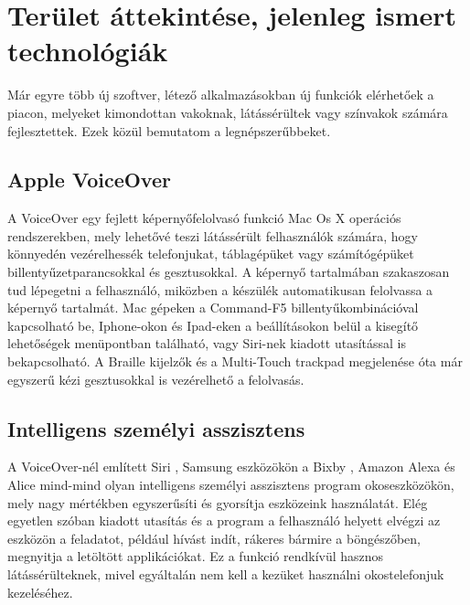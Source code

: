 \documentclass[12pt]{report}
\begin{document}
\chapter{Terület áttekintése, jelenleg ismert technológiák}
Már egyre több új szoftver, létező alkalmazásokban új funkciók elérhetőek a piacon, melyeket kimondottan vakoknak, látássérültek vagy színvakok számára fejlesztettek. Ezek közül bemutatom a legnépszerűbbeket.
\section{Apple VoiceOver}
A VoiceOver \cite{voiceover} egy fejlett képernyőfelolvasó funkció Mac Os X operációs rendszerekben, mely lehetővé teszi látássérült felhasználók számára, hogy könnyedén vezérelhessék telefonjukat, táblagépüket vagy számítógépüket billentyűzetparancsokkal \cite{keysforvoiceover} és gesztusokkal. \cite{usingvoiceover} A képernyő tartalmában szakaszosan tud lépegetni a felhasználó, miközben a készülék automatikusan felolvassa a képernyő tartalmát. Mac gépeken a Command-F5 billentyűkombinációval kapcsolható be, Iphone-okon és Ipad-eken a beállításokon belül a kisegítő lehetőségek menüpontban található, vagy Siri-nek kiadott utasítással is bekapcsolható. A Braille kijelzők \cite{braille} és a Multi-Touch trackpad \cite{multitouch} megjelenése óta már egyszerű kézi gesztusokkal is vezérelhető a felolvasás. \cite{usingvoiceover}

\section{Intelligens személyi asszisztens}
A VoiceOver-nél említett Siri \cite{siri}, Samsung eszközökön a Bixby \cite{bixby}, Amazon Alexa és Alice mind-mind olyan intelligens személyi asszisztens program okoseszközökön, mely nagy mértékben egyszerűsíti és gyorsítja eszközeink használatát. Elég egyetlen szóban kiadott utasítás és a program a felhasználó helyett elvégzi az eszközön a feladatot, például hívást indít, rákeres bármire a böngészőben, megnyitja a letöltött applikációkat. Ez a funkció rendkívül hasznos látássérülteknek, mivel egyáltalán nem kell a kezüket használni okostelefonjuk kezeléséhez.
\end{document}

